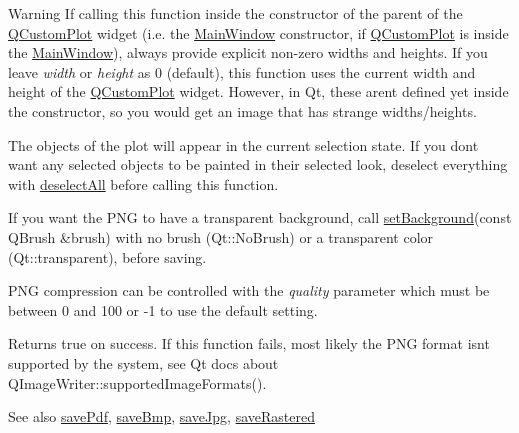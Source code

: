 \begin{DoxyWarning}{Warning}
If calling this function inside the constructor of the parent of the \hyperlink{class_q_custom_plot}{Q\+Custom\+Plot} widget (i.\+e. the \hyperlink{class_main_window}{Main\+Window} constructor, if \hyperlink{class_q_custom_plot}{Q\+Custom\+Plot} is inside the \hyperlink{class_main_window}{Main\+Window}), always provide explicit non-\/zero widths and heights. If you leave {\itshape width} or {\itshape height} as 0 (default), this function uses the current width and height of the \hyperlink{class_q_custom_plot}{Q\+Custom\+Plot} widget. However, in Qt, these aren\textquotesingle{}t defined yet inside the constructor, so you would get an image that has strange widths/heights.
\end{DoxyWarning}
The objects of the plot will appear in the current selection state. If you don\textquotesingle{}t want any selected objects to be painted in their selected look, deselect everything with \hyperlink{class_q_custom_plot_a9d4808ab925b003054085246c92a257c}{deselect\+All} before calling this function.

If you want the P\+NG to have a transparent background, call \hyperlink{class_q_custom_plot_a130358592cfca353ff3cf5571b49fb00}{set\+Background}(const Q\+Brush \&brush) with no brush (Qt\+::\+No\+Brush) or a transparent color (Qt\+::transparent), before saving.

P\+NG compression can be controlled with the {\itshape quality} parameter which must be between 0 and 100 or -\/1 to use the default setting.

Returns true on success. If this function fails, most likely the P\+NG format isn\textquotesingle{}t supported by the system, see Qt docs about Q\+Image\+Writer\+::supported\+Image\+Formats().

\begin{DoxySeeAlso}{See also}
\hyperlink{class_q_custom_plot_a632da44c6d94ea8b271eb483b08b5114}{save\+Pdf}, \hyperlink{class_q_custom_plot_a6629d9e8e6da4bf18055ee0257fdce9a}{save\+Bmp}, \hyperlink{class_q_custom_plot_a490c722092d1771e8ce4a7a73dfd84ab}{save\+Jpg}, \hyperlink{class_q_custom_plot_ab528b84cf92baabe29b1d0ef2f77c93e}{save\+Rastered} 
\end{DoxySeeAlso}

